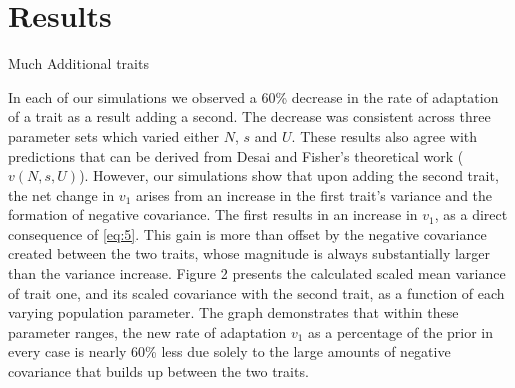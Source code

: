 \documentclass[11pt,twocolumn]{article}
\begin{document}
\section*{Results}
\label{sec:results}
Much Additional traits 

In each of our simulations we observed a 60\% decrease in the rate of adaptation of a trait as a result adding a second. The decrease was consistent across three parameter sets which varied either $N$, $s$ and $U$. These results also agree with predictions that can be derived from Desai and Fisher's theoretical work ($v(N,s,U)$). However, our simulations show that upon adding the second trait, the net change in $v_1$ arises from an increase in the first trait's variance and the formation of negative covariance. The first results in an increase in $v_1$, as a direct consequence of \eqref{eq:5}. This gain is more than offset by the negative covariance created between the two traits, whose magnitude is always substantially larger than the variance increase.  Figure 2 presents the calculated scaled mean variance of trait one, and its scaled covariance with the second trait, as a function of each varying population parameter. The graph demonstrates that within these parameter ranges, the new rate of adaptation $v_1$ as a percentage of the prior in every case is nearly 60\% less due solely to the large amounts of negative covariance that builds up between the two traits.\par
\end{document}
